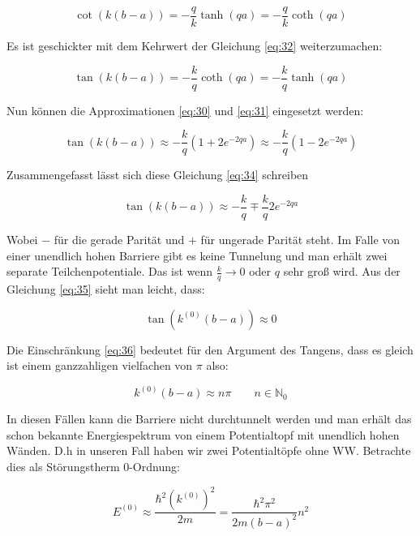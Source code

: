 \begin{equation}
  \label{eq:32}
  \cot(k(b-a)) = - \frac{q}{k} \tanh(qa) =  - \frac{q}{k}\coth(qa)
\end{equation}

Es ist geschickter mit dem Kehrwert der Gleichung \eqref{eq:32} weiterzumachen:


\begin{equation}
  \label{eq:33}
  \tan(k(b-a)) = - \frac{k}{q} \coth(qa) =  - \frac{k}{q}\tanh(qa)
\end{equation}

Nun können die Approximationen \eqref{eq:30} und \eqref{eq:31} eingesetzt werden:

\begin{equation}
  \label{eq:34}
  \tan(k(b-a)) \approx - \frac{k}{q} (1+2e^{-2qa}) \approx  - \frac{k}{q}(1-2e^{-2qa})
\end{equation}

Zusammengefasst lässt sich diese Gleichung \eqref{eq:34} schreiben

\begin{equation}
  \label{eq:35}
  \tan(k(b-a)) \approx - \frac{k}{q} \mp \frac{k}{q} 2e^{-2qa}
\end{equation}

Wobei \(-\) für die gerade Parität und \(+\) für ungerade Parität steht. Im Falle von einer unendlich hohen Barriere gibt es keine Tunnelung und man erhält zwei separate Teilchenpotentiale. Das ist wenn \(\frac{k}{q}\to 0\) oder \(q\) sehr groß wird. Aus der Gleichung \eqref{eq:35} sieht man leicht, dass:


\begin{equation}
  \label{eq:36}
  \tan(k^{(0)}(b-a)) \approx 0
\end{equation}

Die Einschränkung \eqref{eq:36} bedeutet für den Argument des Tangens, dass es gleich ist einem ganzzahligen vielfachen von \(\pi\) also:

\begin{equation}
  \label{eq:37}
  k^{(0)}(b-a) \approx n\pi \qquad n\in \mathbb N_0
\end{equation}

In diesen Fällen kann die Barriere nicht durchtunnelt werden und man erhält das schon bekannte Energiespektrum von einem Potentialtopf mit unendlich hohen Wänden. D.h in unseren Fall haben wir zwei Potentialtöpfe ohne WW. Betrachte dies als Störungstherm 0-Ordnung:

\begin{equation}
  \label{eq:38}
  E^{(0)} \approx \frac{ \hbar^2 (k^{(0)})^2}{2m } = \frac{ \hbar^2\pi^2 }{2m(b-a)^2 }n^2
\end{equation}

